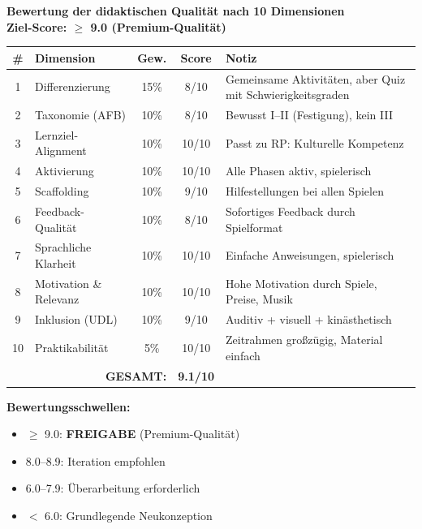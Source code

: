 \documentclass[11pt,a4paper]{article}
\begin{document}
\begin{scorebox}
\textbf{Bewertung der didaktischen Qualität nach 10 Dimensionen}\\
\textbf{Ziel-Score: $\geq$ 9.0 (Premium-Qualität)}

\vspace{1em}
\begin{tabular}{|c|l|c|c|p{4.5cm}|}
\hline
\textbf{\#} & \textbf{Dimension} & \textbf{Gew.} & \textbf{Score} & \textbf{Notiz} \\
\hline
1 & Differenzierung & 15\% & 8/10 & Gemeinsame Aktivitäten, aber Quiz mit Schwierigkeitsgraden \\
\hline
2 & Taxonomie (AFB) & 10\% & 8/10 & Bewusst I--II (Festigung), kein III \\
\hline
3 & Lernziel-Alignment & 10\% & 10/10 & Passt zu RP: Kulturelle Kompetenz \\
\hline
4 & Aktivierung & 10\% & 10/10 & Alle Phasen aktiv, spielerisch \\
\hline
5 & Scaffolding & 10\% & 9/10 & Hilfestellungen bei allen Spielen \\
\hline
6 & Feedback-Qualität & 10\% & 8/10 & Sofortiges Feedback durch Spielformat \\
\hline
7 & Sprachliche Klarheit & 10\% & 10/10 & Einfache Anweisungen, spielerisch \\
\hline
8 & Motivation \& Relevanz & 10\% & 10/10 & Hohe Motivation durch Spiele, Preise, Musik \\
\hline
9 & Inklusion (UDL) & 10\% & 9/10 & Auditiv + visuell + kinästhetisch \\
\hline
10 & Praktikabilität & 5\% & 10/10 & Zeitrahmen großzügig, Material einfach \\
\hline
\multicolumn{3}{|r|}{\textbf{GESAMT:}} & \textbf{9.1/10} & \\
\hline
\end{tabular}

\vspace{1em}
\textbf{Bewertungsschwellen:}
\begin{itemize}
    \item[\checkmark] \textcolor{successgreen}{$\geq$ 9.0: \textbf{FREIGABE} (Premium-Qualität)}
    \item[$\Box$] \textcolor{warningorange}{8.0--8.9: Iteration empfohlen}
    \item[$\Box$] 6.0--7.9: Überarbeitung erforderlich
    \item[$\Box$] $<$ 6.0: Grundlegende Neukonzeption
\end{itemize}


\end{scorebox}
\end{document}
